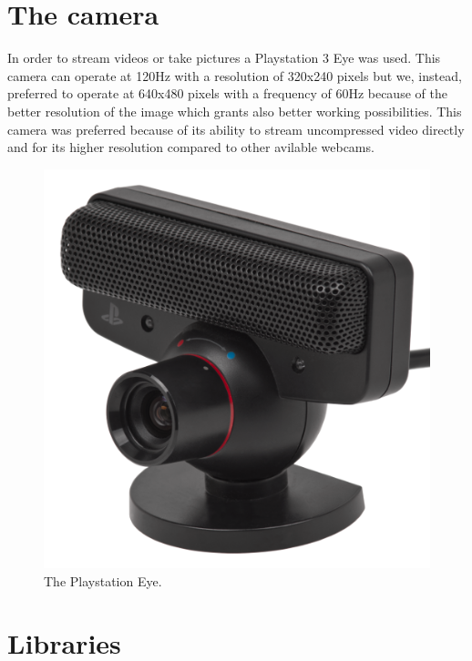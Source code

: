 \section{The camera}
In order to stream videos or take pictures a Playstation 3 Eye was used.
This camera can operate at 120Hz with a resolution of 320x240 pixels but we, instead, preferred to operate at 640x480 pixels with a frequency of 60Hz because of the better resolution of the image which grants also better working possibilities. 
This camera was preferred because of its ability to stream uncompressed video directly \cite{pseyecompr} and for its higher resolution compared to other avilable webcams.
\vspace{0.5cm}
\begin{figure}[hbt]
    \centering
    \includegraphics[scale=0.9]{img/pseye.png}
    \caption{The Playstation Eye.}
\end{figure}
 
\newpage
\section{Libraries}

